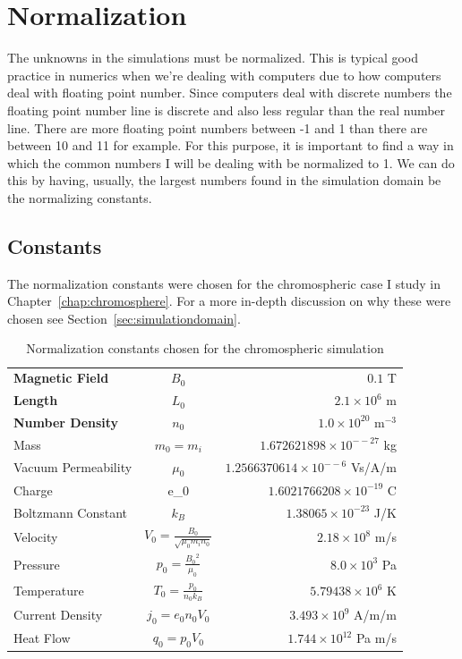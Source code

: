 \documentclass[12pt,upcase]{umlthesis}
\begin{document}
\section{Normalization}\label{sec:normalization}

The unknowns in the simulations must be normalized. This is typical good practice in numerics when we're dealing with computers due to how computers deal with floating point number. Since computers deal with discrete numbers the floating point number line is discrete and also less regular than the real number line. There are more floating point numbers between -1 and 1 than there are between 10 and 11 for example. For this purpose, it is important to find a way in which the common numbers I will be dealing with be normalized to 1. We can do this by having, usually, the largest numbers found in the simulation domain be the normalizing constants.

\subsection{Constants}\label{sec:normconstants}

The normalization constants were chosen for the chromospheric case I study in Chapter~\ref{chap:chromosphere}. For a more in-depth discussion on why these were chosen see Section~\ref{sec:simulationdomain}.

\begin{table}[h]\label{tab:normalization}
\centering
\caption[Normalization Constants]{Normalization constants chosen for the chromospheric simulation}
\begin{tabular}[]{l  c  r}
	\toprule
	\textbf{Magnetic Field} & $B_0$ & $0.1$ T\\
	\textbf{Length} & $L_0$ & $2.1 \times 10^6$ m \\
	\textbf{Number Density} & $n_0$ & $1.0\times 10^{20}$ m$^{-3}$ \\
	Mass & $m_0 = m_i$ & $1.672621898\times 10^{-−27}$ kg \\
	Vacuum Permeability & $\mu_0$ & $1.2566370614\times 10^{-−6}$ Vs/A/m \\
	Charge & e_0 & $1.6021766208\times10^{-19}$ C \\
	Boltzmann Constant & $k_B$ & $1.38065\times10^{-23}$ J/K\\
	Velocity & $V_0=\frac{B_0}{\sqrt{\mu_0 m_i n_0}}$ & $2.18 \times 10^{8}$ m/s\\
	Pressure & $p_0= \frac{{B_0}^2}{\mu_0}$ & $8.0 \times 10^3$ Pa \\
	Temperature & $T_0 = \frac{p_0}{n_0 k_B} $ & $5.79438\times10^6$ K\\
	Current Density & $j_0 = e_0 n_0 V_0$ & $3.493\times10^9$ A/m/m \\
	Heat Flow & $q_0 = p_0 V_0$ & $1.744\times10^{12}$ Pa m/s \\
	\bottomrule
\end{tabular}
\end{table}
\end{document}
